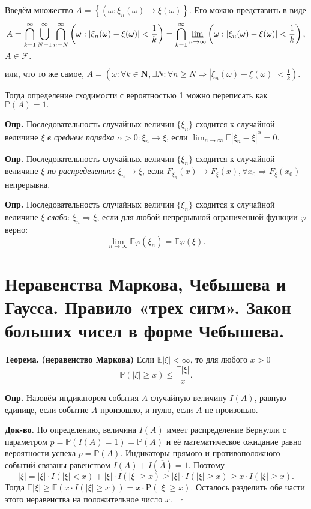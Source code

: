 \documentclass[oneside,final,14pt]{extreport}
\newcommand\mydef{{\bf Опр.}}
\newcommand\myth{{\bf Теорема.}}
\newcommand\myqed{{\bf Док-во.}}
\newcommand\myprob[1]{{\mathbb{P}(#1)}}
\theoremstyle{definition}
\begin{document}
Введём множество $A=\left\{\left(\omega: \xi_{n}(\omega) \rightarrow \xi(\omega)\right\}\right.$. Его можно представить в виде 
$$A=\bigcap_{k=1}^{\infty} \bigcup_{N=1}^{\infty} \bigcap_{n=N}^{\infty}\left(\omega:\left|\xi_{n}(\omega)-\xi(\omega)\right|<\frac{1}{k}\right)=\bigcap_{k=1}^{\infty} \varliminf_{n \to \infty}\left(\omega:\left|\xi_{n}(\omega)-\xi(\omega)\right|<\frac{1}{k}\right),$$ $A \in \mathcal{F}.$

или, что то же самое, $A=\left(\omega: \forall k \in \mathbf{N}, \exists N: \forall n \geq N \Rightarrow\left|\xi_{n}(\omega)-\xi(\omega)\right|<\frac{1}{k}\right).$

Тогда определение сходимости с вероятностью 1 можно переписать как $\myprob{A} = 1.$

\mydef{} Последовательность случайных величин $\{ \xi_n \}$ сходится к случайной величине $\xi$ {\it в среднем порядка} $\alpha > 0: \xi_n \rightarrow \xi$, если $\lim _{n \to \infty} \mathbb{E}\left|\xi_{n}-\xi\right|^{\alpha}=0.$

\mydef{} Последовательность случайных величин $\{ \xi_n \}$ сходится к случайной величине $\xi$ {\it по распределению}: $\xi_n \rightarrow \xi$, если $F_{\xi_n}(x) \rightarrow F_\xi(x), \forall x_0 \Rightarrow F_\xi(x_0)$ непрерывна.

\mydef{} Последовательность случайных величин $\{ \xi_n \}$ сходится к случайной величине $\xi$ {\it слабо}: $\xi_n \Rightarrow \xi$, если для любой непрерывной ограниченной функции $\varphi$ верно:
$$\lim _{n \to \infty} \mathbb{E} \varphi\left(\xi_{n}\right)=\mathbb{E} \varphi(\xi).$$

\section{Неравенства Маркова, Чебышева и Гаусса. Правило «трех сигм». Закон больших чисел в форме Чебышева.}

\myth{} \textbf{(неравенство Маркова)} Если $\mathbb{E}|\xi| < \infty$, то для любого $x > 0$
$$\myprob{|\xi| \geqslant x} \leqslant \frac{\mathbb{E}|\xi|}{x}.$$

\mydef{}  Назовём индикатором события $A$ случайную величину $I(A)$, равную единице, если событие $A$ произошло, и нулю, если $A$ не произошло.

\myqed{} По определению, величина $I(A)$ имеет распределение Бернулли с параметром $p = \myprob{I(A) = 1} = \myprob{A}$ и её математическое ожидание равно вероятности успеха $p = \myprob{A}.$ Индикаторы прямого и противоположного событий связаны равенством $I(A) + I(\overline{A}) = 1.$ Поэтому
$$|\xi|=|\xi| \cdot I(|\xi|<x)+|\xi| \cdot I(|\xi| \geqslant x) \geqslant|\xi| \cdot I(|\xi| \geqslant x) \geqslant x \cdot I(|\xi| \geqslant x).$$
Тогда $\mathbb{E}|\xi| \geqslant \mathbb{E}(x \cdot I(|\xi| \geqslant x))=x \cdot \mathrm{P}(|\xi| \geqslant x)$. Осталось разделить обе части этого неравенства на положительное число $x$. $~~~\square$
\end{document}
